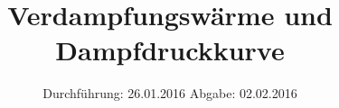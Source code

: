 

\subject{V203}
\title{Verdampfungswärme und Dampfdruckkurve}
\date{
  Durchführung: 26.01.2016
  \hspace{3em}
  Abgabe: 02.02.2016
}



\maketitle
\thispagestyle{empty}
\tableofcontents
\newpage







\printbibliography


